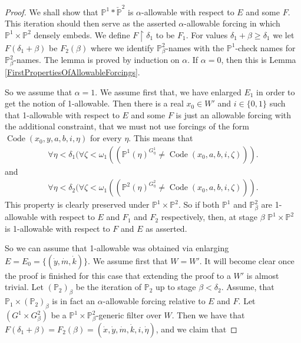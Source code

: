 \documentclass[10pt,a4paper]{amsart}
\newcommand{\forceP}{\mathbb{P}}
\begin{document}
\begin{proof}
We shall show that $\forceP^1 \ast \check{\forceP}^2$ is $\alpha$-allowable with respect to $E$ and some $F$. This iteration should then serve as the asserted $\alpha$-allowable forcing in which $\forceP^1 \times \forceP^2$ densely embeds. 
We define $F \upharpoonright \delta_1$ to be $F_1$. For values $\delta_1+ \beta  \ge \delta_1$ we let $F(\delta_1+\beta)$ be $F_2(\beta)$ where we identify $\forceP^2_{\beta}$-names with the $\forceP^1$-check names for $\forceP^2_{\beta}$-names. The lemma is proved by induction on $\alpha$. If $\alpha=0$, then this is Lemma \ref{FirstPropertiesOfAllowableForcings}. 

So we assume that $\alpha=1$. We assume first that, we have enlarged $E_1$ in order to get the notion of 1-allowable. Then there is a real $x_0 \in W'$ and $i \in \{0,1\}$ such that 1-allowable with respect to $E$ and some $F$ is just an allowable forcing with the additional constraint, that we must not use forcings of the form $\operatorname{Code} (x_0,y,a,b,i, \eta)$ for every $\eta$. This means that
    \begin{align*}
        \forall \eta < \delta_1 ( \forall \zeta < \omega_1 (( \mathbb{P}^1(\eta)^{G^1_{\eta}} \neq \operatorname{Code}(x_0, a, b, i, \zeta) )).
    \end{align*}
    and
    \begin{align*}
        \forall \eta < \delta_2 ( \forall \zeta < \omega_1 (( \mathbb{P}^2(\eta)^{G^2_{\eta}} \neq \operatorname{Code}(x_0, a, b, i, \zeta) )).
    \end{align*}
    This property is clearly preserved under $\forceP^1 \times \forceP^2$.
    So if both $\forceP^1$ and $\forceP^2_{\beta}$ are 1-allowable with respect to $E $ and $F_1$ and $F_2$ respectively, then, at stage $\beta$ $\forceP^1 \times \forceP^2$ is 1-allowable with respect to $F$ and $E$ as asserted.


So we can assume that 1-allowable was obtained via enlarging $E=E_0= \{(\dot{y},\dot{m},\dot{k})\}$. 
We assume first that $W= W'$. It will become clear once the proof is finished for this case that extending the proof to a $W'$ is almost trivial.
Let $(\forceP_2)_{\beta}$ be the iteration of $\forceP_2$ up to stage $\beta < \delta_2$. Assume, that $\forceP_1 \times (\forceP_2)_{\beta}$ is in fact an $\alpha$-allowable forcing relative to $E$ and $F$. Let $(G^1 \times G^2_{\beta})$ be a $\forceP^1 \times \forceP^2_{\beta}$-generic filter over $W$.  Then we have that $F(\delta_1+\beta) =F_2(\beta)  =(\dot{x},\dot{y},\dot{m},\dot{k} ,i,\dot{\eta})$, and we claim that


\end{proof}
\end{document}
